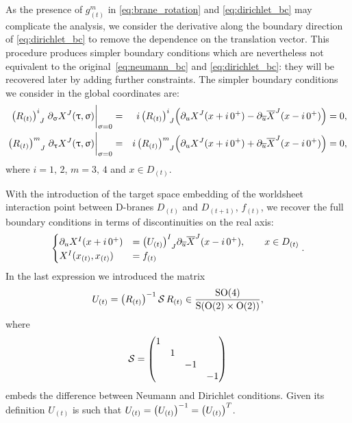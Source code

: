 As the presence of $g_{(t)}^m$ in \eqref{eq:brane_rotation} and \eqref{eq:dirichlet_bc} may complicate the analysis, we consider the derivative along the boundary direction of \eqref{eq:dirichlet_bc} to remove the dependence on the translation vector.
This procedure produces simpler boundary conditions which are nevertheless not equivalent to the original~\eqref{eq:neumann_bc} and \eqref{eq:dirichlet_bc}: they will be recovered later by adding further constraints.
The simpler boundary conditions we consider in the global coordinates are:
\begin{eqnarray}
  \tensor{\qty( R_{(t)} )}{^i_J}
  \eval{\ipd{\sigma} X^J( \tau, \sigma )}_{\sigma = 0}
  & = &
  i\, \tensor{\qty( R_{(t)} )}{^i_J}
  \qty(
    \ipd{u} X^J( x + i\, 0^+ ) - \ipd{\baru} \barX^J( x - i\, 0^+ )
  )
  =
  0,
  \\
  \tensor{\qty( R_{(t)} )}{^m_J}
  \eval{\ipd{\tau} X^J( \tau, \sigma )}_{\sigma = 0}
  & = &
  i\, \tensor{\qty( R_{(t)} )}{^m_J}
  \qty(
    \ipd{u} X^J( x + i\, 0^+ ) + \ipd{\baru} \barX^J( x - i\, 0^+ )
  )
  =
  0,
\end{eqnarray}
where $i = 1,\, 2$, $m = 3,\, 4$ and $x \in D_{(t)}$.

With the introduction of the target space embedding of the worldsheet interaction point between D-branes $D_{(t)}$ and $D_{(t+1)}$, $f_{(t)}$, we recover the full boundary conditions in terms of discontinuities on the real axis:
\begin{equation}
  \begin{cases}
    \ipd{u} X^I( x + i\, 0^+ )
    & =
    \tensor{\qty( U_{(t)} )}{^I_J}
    \ipd{\baru} \barX^J( x - i\, 0^+ ),
    \qquad
    x \in D_{(t)}
    \\
    X^I( x_{(t)}, x_{(t)} )
    & =
    f_{(t)}
  \end{cases}.
  \label{eq:discontinuity_bc}
\end{equation}
In the last expression we introduced the matrix
\begin{equation}
  U_{(t)}
  =
  \qty( R_{(t)} )^{-1}\,
  \mathcal{S}\,
  R_{(t)}
  \in
  \frac{\mathrm{SO}(4)}{\mathrm{S}\qty( \mathrm{O}(2) \times \mathrm{O}(2) )},
  \label{eq:Umatrices}
\end{equation}
where
\begin{equation}
  \cS
  =
  \mqty( \dmat{ 1, 1, -1, -1 } )
  \label{eq:reflection_S}
\end{equation}
embeds the difference between Neumann and Dirichlet conditions.
Given its definition $U_{(t)}$ is such that $U_{(t)} = \qty( U_{(t)} )^{-1} = \qty( U_{(t)} )^T$.

